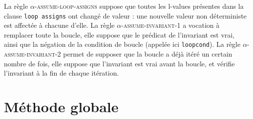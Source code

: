 La règle \textsc{$\alpha$-assume-loop-assigns} suppose que toutes les l-values
présentes dans la clause \lstinline'loop assigns' ont changé de valeur : une
nouvelle valeur non déterministe est affectée à chacune d'elle.
La règle \textsc{$\alpha$-assume-invariant-1} a vocation à remplacer toute la
boucle, elle suppose que le prédicat de l'invariant est vrai, ainsi que la
négation de la condition de boucle (appelée ici \lstinline'loopcond').
La règle \textsc{$\alpha$-assume-invariant-2} permet de supposer que la boucle
a déjà itéré un certain nombre de fois, elle suppose que l'invariant est vrai
avant la boucle, et vérifie l'invariant à la fin de chaque itération.

\section{Méthode globale}
